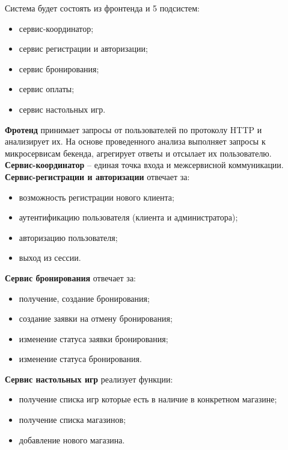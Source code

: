 Система будет состоять из фронтенда и 5 подсистем:
\begin{itemize}
	\item сервис-координатор;
	
	\item сервис регистрации и авторизации;
	
	\item сервис бронирования;
	
	\item сервис оплаты;
	
	\item сервис настольных игр.
\end{itemize}
%
\textbf{Фротенд} принимает запросы от пользователей по протоколу HTTP и анализирует их. На основе проведенного анализа выполняет запросы к микросервисам бекенда, агрегирует ответы и отсылает их пользователю. \\
\textbf{Сервис-координатор} -- единая точка входа и межсервисной коммуникации. \\
\textbf{Сервис-регистрации и авторизации} отвечает за:
\begin{itemize}
	\item возможность регистрации нового клиента;
	
	\item аутентификацию пользователя (клиента и администратора);
	
	\item авторизацию пользователя;
	
	\item выход из сессии.
\end{itemize}
\textbf{Сервис бронирования} отвечает за:
\begin{itemize}
	\item получение, создание бронирования;
	\item создание заявки на отмену бронирования;
	\item изменение статуса заявки бронирования;
	\item изменение статуса бронирования.
\end{itemize}
\textbf{Сервис настольных игр} реализует функции:

\begin{itemize}    
    \item получение списка игр которые есть в наличие в конкретном магазине;
    
    \item получение списка магазинов;
    
    \item добавление нового магазина.
\end{itemize}

